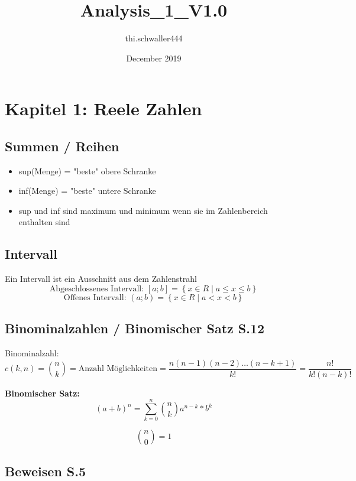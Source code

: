 \documentclass{article}
\title{Analysis_1_V1.0}
\author{thi.schwaller444 }
\date{December 2019}
\begin{document}
\section{Kapitel 1: Reele Zahlen}
	\subsection{Summen / Reihen}
	\begin{itemize}
		\item sup(Menge) = "beste" obere Schranke
		\item inf(Menge) = "beste" untere Schranke
		\item sup und inf sind maximum und minimum wenn sie im Zahlenbereich enthalten sind
	\end{itemize}
	\subsection{Intervall}
	Ein Intervall ist ein Ausschnitt aus dem Zahlenstrahl
	\begin{equation}
		\textrm{Abgeschlossenes Intervall: } [a;b] = \left\{ x \in R \mid a \le x \le b \right\}
	\end{equation}
	\begin{equation}
	\textrm{Offenes Intervall: } (a;b) = \left\{ x \in R \mid a < x < b \right\}
	\end{equation}
		\subsection{Binominalzahlen / Binomischer Satz S.12}
	Binominalzahl:
	\begin{equation}
		c(k,n) = \binom{n}{k} = \textrm{Anzahl Möglichkeiten} = \frac{n(n-1)(n-2) \dots (n-k+1)}{k!} = \frac{n!}{k!(n - k)!}
	\end{equation}
	\begin{multicols}{2}
		\textbf{Binomischer Satz:}
	\begin{equation}
		(a+b) ^n = \sum_{k = 0}^{n} \binom{n}{k} a^{n-k} * b^k
	\end{equation}
	\columnbreak
	\begin{center}
	    	\begin{equation}
	    \binom{n}{0} = 1
	\end{equation}
	\end{center}
	\end{multicols}
    \subsection{Beweisen S.5}
\end{document}
